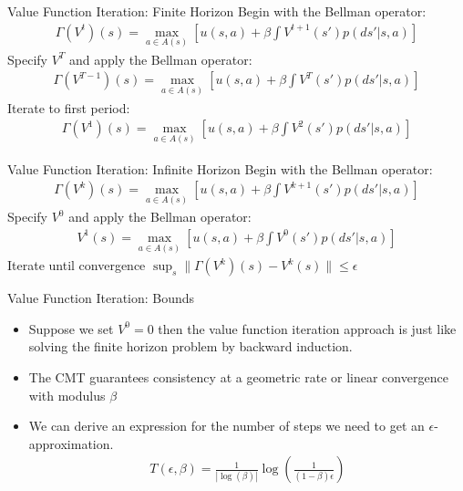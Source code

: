 \begin{frame}{Value Function Iteration: Finite Horizon}
Begin with the Bellman operator:
\begin{eqnarray*}
\Gamma(V^t)(s) = \max_{a \in A(s)} \left[ u(s,a) + \beta \int V^{t+1}(s')p(ds' | s,a) \right]
\end{eqnarray*}
Specify $V^T$ and apply the Bellman operator:
\begin{eqnarray*}
\Gamma(V^{T-1})(s) = \max_{a \in A(s)} \left[ u(s,a) + \beta \int V^{T}(s')p(ds' | s,a) \right]
\end{eqnarray*}
Iterate to first period:
\begin{eqnarray*}
\Gamma(V^1)(s) = \max_{a \in A(s)} \left[ u(s,a) + \beta \int V^{2}(s')p(ds' | s,a) \right]
\end{eqnarray*}
\end{frame}

\begin{frame}{Value Function Iteration: Infinite Horizon}
Begin with the Bellman operator:
\begin{eqnarray*}
\Gamma(V^k)(s) = \max_{a \in A(s)} \left[ u(s,a) + \beta \int V^{k+1}(s')p(ds' | s,a) \right]
\end{eqnarray*}
Specify $V^0$ and apply the Bellman operator:
\begin{eqnarray*}
V^{1}(s) = \max_{a \in A(s)} \left[ u(s,a) + \beta \int V^{0}(s')p(ds' | s,a) \right]
\end{eqnarray*}
Iterate until convergence  $ \sup_s \| \Gamma(V^k)(s) - V^k(s) \| \leq \epsilon $
\end{frame}

\begin{frame}{Value Function Iteration: Bounds}
\begin{itemize}
\item Suppose we set $V^0 =0$ then the value function iteration approach is just like solving the finite horizon problem by backward induction.
\item The CMT guarantees consistency at a geometric rate or \alert{linear} convergence with modulus $\beta$
\item We can derive an expression for the number of steps we need to get an $\epsilon$-approximation.
\begin{eqnarray*}
T(\epsilon,\beta) = \frac{1}{| \log(\beta) | } \log \left (\frac{1}{(1-\beta)\epsilon} \right)
\end{eqnarray*}
\end{itemize}
\end{frame}

